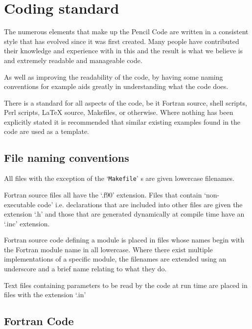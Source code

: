 \documentclass[\mydriver,12pt,twoside,notitlepage,a4paper]{article}
\makeatletter
\newcommand{\file}[2][]{%
  \def\index@{#1}%
  `\texttt{#2}'%
  \ifx\index@\@empty\index[file]{#2@\texttt{#2}}%
  \else\index[file]{#1@\texttt{#1}}%
  \fi%
}
\makeatother
\begin{document}
\section{Coding standard}
\label{coding-standard}

The numerous elements that make up the {\sc Pencil Code} are written
in a consistent style that has evolved since it was first created.
Many people have contributed their knowledge and experience with
in this and the result is what we believe is and extremely
readable and manageable code.

As well as improving the readability of the code, by having some
naming conventions for example aids greatly in understanding what
the code does.

There is a standard for all aspects of the code, be it Fortran source,
shell scripts, Perl scripts, LaTeX source, Makefiles, or otherwise.
Where nothing has been explicitly stated it is recommended that
similar existing examples found in the code are used as a template.

\subsection{File naming conventions}
All files with the exception of the \file{Makefile}s are given
lowercase filenames.

Fortran source files all have the `.f90' extension.  Files that
contain `non-executable code' i.e. declarations that are included into
other files are given the extension `.h' and those that are generated
dynamically at compile time have an `.inc' extension.

Fortran source code defining a module is placed in files whose names
begin with the Fortran module name in all lowercase.  Where there
exist multiple implementations of a specific module, the filenames
are extended using an underscore and a brief name relating
to what they do.

Text files containing parameters to be read by the code at run time are
placed in files with the extension `.in'

\subsection{Fortran Code}
\label{CodingStandards}
\end{document}
